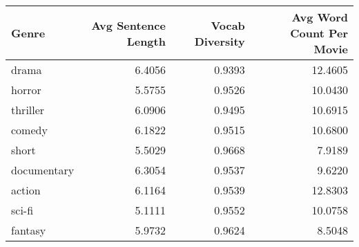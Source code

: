 \begin{tabular}{lrrr}
\toprule
Genre & Avg Sentence Length & Vocab Diversity & Avg Word Count Per Movie \\
\midrule
drama & 6.4056 & 0.9393 & 12.4605 \\
horror & 5.5755 & 0.9526 & 10.0430 \\
thriller & 6.0906 & 0.9495 & 10.6915 \\
comedy & 6.1822 & 0.9515 & 10.6800 \\
short & 5.5029 & 0.9668 & 7.9189 \\
documentary & 6.3054 & 0.9537 & 9.6220 \\
action & 6.1164 & 0.9539 & 12.8303 \\
sci-fi & 5.1111 & 0.9552 & 10.0758 \\
fantasy & 5.9732 & 0.9624 & 8.5048 \\
\bottomrule
\end{tabular}
